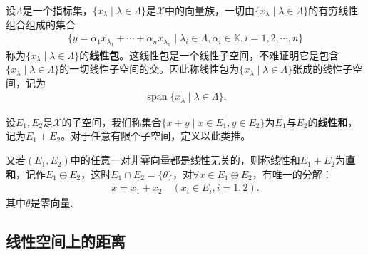 \documentclass[../../main.tex]{subfiles}%
\begin{document}
\begin{definition}[线性包]
设$\Lambda$是一个指标集，$\{x_\lambda\mid\lambda\in\Lambda\}$是$\mathscr{X}$中的向量族，一切由$\{x_\lambda\mid\lambda\in\Lambda\}$的有穷线性组合组成的集合
\begin{align*}
\{y=\alpha_1x_{\lambda_1}+\cdots+\alpha_nx_{\lambda_n}\mid\lambda_i\in\Lambda,\alpha_i\in\mathbb{K},i=1,2,\cdots,n\}
\end{align*}
称为$\{x_\lambda\mid\lambda\in\Lambda\}$的\textbf{线性包}。这线性包是一个线性子空间，不难证明它是包含$\{x_\lambda\mid\lambda\in\Lambda\}$的一切线性子空间的交。因此称线性包为$\{x_\lambda\mid\lambda\in\Lambda\}$张成的线性子空间，记为
\begin{align*}
\operatorname{span}\{x_\lambda\mid\lambda\in\Lambda\}.
\end{align*}
\end{definition}

\begin{definition}
设$E_1,E_2$是$\mathscr{X}$的子空间，我们称集合$\{x+y\mid x\in E_1,y\in E_2\}$为$E_1$与$E_2$的\textbf{线性和}，记为$E_1+E_2$。对于任意有限个子空间，定义以此类推。

又若$(E_1,E_2)$中的任意一对非零向量都是线性无关的，则称线性和$E_1+E_2$为\textbf{直和}，记作$E_1\oplus E_2$，这时$E_1\cap E_2=\{\theta\}$，对$\forall x\in E_1\oplus E_2$，有唯一的分解：
\begin{align*}
x=x_1+x_2\quad(x_i\in E_i,i=1,2).
\end{align*}
其中$\theta$是零向量.
\end{definition}

\subsection{线性空间上的距离}
\end{document}
